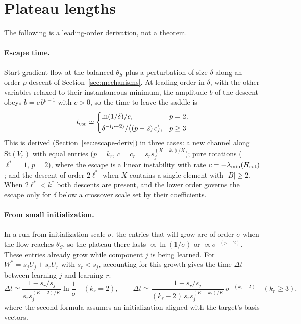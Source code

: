\documentclass[11pt]{article}
\theoremstyle{definition}
\newcommand{\St}{\mathrm{St}}
\begin{document}
\section{Plateau lengths}\label{sec:plateaus}

The following is a leading-order derivation, not a theorem.

\paragraph{Escape time.} Start gradient flow at the balanced $\theta_S$ plus a perturbation of size $\delta$ along an
order-$p$ descent of Section~\ref{sec:mechanisms}. At leading order in $\delta$, with the other variables relaxed to their
instantaneous minimum, the amplitude $b$ of the descent obeys $\dot b=c\,b^{p-1}$ with $c>0$, so the time to leave the
saddle is
\begin{equation}\label{eq:escape}
t_{\rm esc}\simeq\begin{cases}\ln(1/\delta)/c, & p=2,\\[2pt] \delta^{-(p-2)}/\big((p-2)\,c\big), & p\ge3.\end{cases}
\end{equation}
This is derived (Section~\ref{sec:escape-deriv}) in three cases: a new channel along $\St(V_r)$ with equal entries
($p=k_r$, $c=c_r=s_rs_j^{(K-k_r)/K}$); pure rotations ($\ell^*=1$, $p=2$), where the escape is a linear instability with
rate $c=-\lambda_{\min}(H_{\rm rot})$; and the descent of order $2\ell^*$ when $X$ contains a single element with
$\lvert B\rvert\ge2$. When $2\ell^*<k^*$ both descents are present, and the lower order governs the escape only for $\delta$
below a crossover scale set by their coefficients.

\paragraph{From small initialization.} In a run from initialization scale $\sigma$, the entries that will grow are of order
$\sigma$ when the flow reaches $\theta_S$, so the plateau there lasts $\propto\ln(1/\sigma)$ or $\propto\sigma^{-(p-2)}$. These
entries already grow while component $j$ is being learned. For $W^*=s_jU_j+s_rU_r$ with $s_r<s_j$, accounting for this growth
gives the time $\Delta t$ between learning $j$ and learning $r$:
\begin{equation}\label{eq:twocomp}
\Delta t\simeq\frac{1-s_r/s_j}{s_rs_j^{(K-2)/K}}\ln\frac1\sigma\quad(k_r=2),\qquad
\Delta t\simeq\frac{1-s_r/s_j}{(k_r-2)\,s_rs_j^{(K-k_r)/K}}\,\sigma^{-(k_r-2)}\quad(k_r\ge3),
\end{equation}
where the second formula assumes an initialization aligned with the target's basis vectors.
\end{document}
